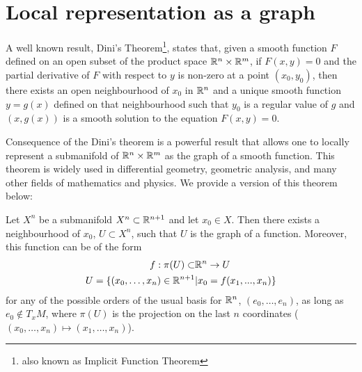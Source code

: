 




\section{Local representation as a graph}

A well known result, Dini's Theorem\footnote{also known as Implicit Function Theorem}, states that, given a smooth function $F$ defined on an open subset of the product space $\mathbb{R}^n \times \mathbb{R}^m$, if $F(x,y) = 0$ and the partial derivative of $F$ with respect to $y$ is non-zero at a point $(x_0, y_0)$, then there exists an open neighbourhood of $x_0$ in $\mathbb{R}^n$ and a unique smooth function $y = g(x)$ defined on that neighbourhood such that $y_0$ is a regular value of $g$ and $(x, g(x))$ is a smooth solution to the equation $F(x, y) = 0$.

Consequence of the Dini's theorem is a powerful result that allows one to locally represent a submanifold of $\mathbb{R}^n \times \mathbb{R}^m$ as the graph of a smooth function. This theorem is widely used in differential geometry, geometric analysis, and many other fields of mathematics and physics. We provide a version of this theorem below:

\begin{theorem}
	Let $X^n$ be a submanifold $X^n\subset\mathbb{R}^{n+1}$ and let $x_0\in X$. Then there exists a neighbourhood of $x_0$, $U\subset X^n$, such that $U$ is the graph of a function. 
	Moreover, this function can be of the form 
	\begin{align*}
		f:\pi(U)\subset&\mathbb{R}^n\rightarrow U \\
		U=\{(x_0, \dots, x_n)\in \mathbb{R}^{n+1}&|x_0= f(x_1, ..., x_n)\}
	\end{align*}
	for any of the possible orders of the usual basis for $\mathbb{R}^n$, $(e_0, \dots, e_n)$, as long as $e_0\notin T_xM$, where $\pi(U)$ is the projection on the last $n$ coordinates ($(x_0, \dots, x_n) \mapsto (x_1, \dots, x_n)$). \label{localgraphclassic}
\end{theorem}

